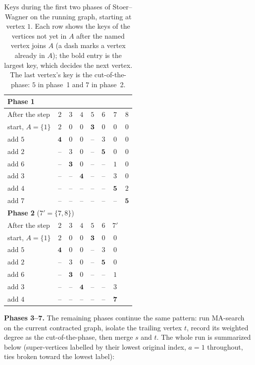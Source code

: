 \begin{table}[htbp]
\centering
\small
\begin{tabular}{lccccccc}
\toprule
\multicolumn{8}{l}{\textbf{Phase 1}}\\
\midrule
After the step & $2$ & $3$ & $4$ & $5$ & $6$ & $7$ & $8$ \\
\midrule
start, $A=\{1\}$ & $2$ & $0$ & $0$ & $\mathbf{3}$ & $0$ & $0$ & $0$ \\
add $5$ & $\mathbf{4}$ & $0$ & $0$ & -- & $3$ & $0$ & $0$ \\
add $2$ & -- & $3$ & $0$ & -- & $\mathbf{5}$ & $0$ & $0$ \\
add $6$ & -- & $\mathbf{3}$ & $0$ & -- & -- & $1$ & $0$ \\
add $3$ & -- & -- & $\mathbf{4}$ & -- & -- & $3$ & $0$ \\
add $4$ & -- & -- & -- & -- & -- & $\mathbf{5}$ & $2$ \\
add $7$ & -- & -- & -- & -- & -- & -- & $\mathbf{5}$ \\
\midrule
\multicolumn{8}{l}{\textbf{Phase 2} ($7'=\{7,8\}$)}\\
\midrule
After the step & $2$ & $3$ & $4$ & $5$ & $6$ & $7'$ & \\
\midrule
start, $A=\{1\}$ & $2$ & $0$ & $0$ & $\mathbf{3}$ & $0$ & $0$ & \\
add $5$ & $\mathbf{4}$ & $0$ & $0$ & -- & $3$ & $0$ & \\
add $2$ & -- & $3$ & $0$ & -- & $\mathbf{5}$ & $0$ & \\
add $6$ & -- & $\mathbf{3}$ & $0$ & -- & -- & $1$ & \\
add $3$ & -- & -- & $\mathbf{4}$ & -- & -- & $3$ & \\
add $4$ & -- & -- & -- & -- & -- & $\mathbf{7}$ & \\
\bottomrule
\end{tabular}
\caption{Keys during the first two phases of Stoer--Wagner on the running graph, starting at vertex $1$. Each row shows the keys of the vertices not yet in $A$ after the named vertex joins $A$ (a dash marks a vertex already in $A$); the bold entry is the largest key, which decides the next vertex. The last vertex's key is the cut-of-the-phase: $5$ in phase~1 and $7$ in phase~2.}
\label{ch11:tab-phase12}
\end{table}

\textbf{Phases 3--7.} The remaining phases continue the same pattern: run MA-search on the current contracted graph, isolate the trailing vertex $t$, record its weighted degree as the cut-of-the-phase, then merge $s$ and $t$. The whole run is summarized below (super-vertices labelled by their lowest original index, $a=1$ throughout, ties broken toward the lowest label):

